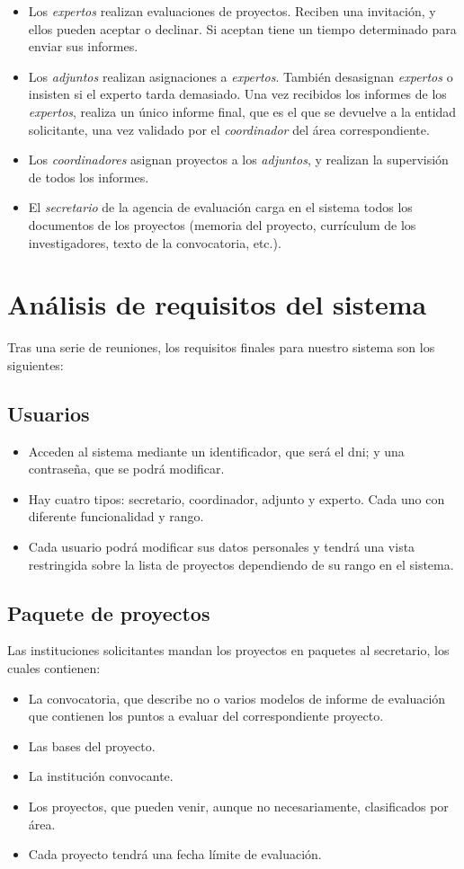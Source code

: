 \documentclass[12pt,a4paper,titlepage,spanish,twoside]{book}
\begin{document}
\begin{itemize}
\item Los \emph{expertos} realizan evaluaciones de proyectos. Reciben una 
  invitación, y ellos pueden aceptar o declinar. Si aceptan tiene un tiempo 
  determinado para enviar sus informes. 
\item Los \emph{adjuntos} realizan asignaciones a \emph{expertos}. También
  desasignan
  \emph{expertos} o insisten si el experto tarda demasiado. Una vez recibidos
  los 
  informes de los \emph{expertos}, realiza un único informe final, que es el
  que se 
  devuelve a la entidad solicitante, una vez validado por el
  \emph{coordinador} del área correspondiente.  
\item Los \emph{coordinadores} asignan proyectos a los \emph{adjuntos}, y
  realizan la supervisión de todos los informes. 
\item El \emph{secretario} de la agencia de evaluación carga en el sistema todos
  los documentos de los proyectos (memoria del proyecto, currículum de los
  investigadores, texto de la convocatoria, etc.). 
\end{itemize}

\section{Análisis de requisitos del sistema}
Tras una serie de reuniones, los requisitos finales para nuestro sistema son
los siguientes: 

\subsection{Usuarios}
\begin{itemize}
\item Acceden al sistema mediante un identificador, que será el dni; y una 
contraseña, que se podrá modificar.
\item Hay cuatro tipos: secretario, coordinador, adjunto y experto. Cada uno
  con diferente funcionalidad y rango. 
\item Cada usuario podrá modificar sus datos personales y tendrá una vista
  restringida sobre la lista de proyectos dependiendo de su rango en el 
  sistema.
\end{itemize}

\subsection{Paquete de proyectos}
Las instituciones solicitantes mandan los proyectos en paquetes al
secretario, los cuales contienen: 
\begin{itemize}
\item La convocatoria, que describe no o varios modelos de informe de
  evaluación que contienen los puntos a evaluar del correspondiente proyecto.
\item Las bases del proyecto.
\item La institución convocante.
\item Los proyectos, que pueden venir, aunque no necesariamente, clasificados
  por área. 
\item Cada proyecto tendrá una fecha límite de evaluación.
\end{itemize}
\end{document}
